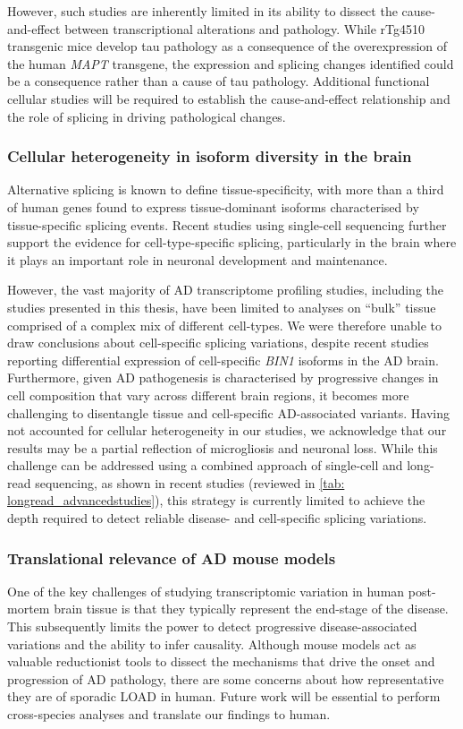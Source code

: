 However, such studies are inherently limited in its ability to dissect the cause-and-effect between transcriptional alterations and pathology. While rTg4510 transgenic mice develop tau pathology as a consequence of the overexpression of the human \textit{MAPT} transgene, the expression and splicing changes identified could be a consequence rather than a cause of tau pathology. Additional functional cellular studies will be required to establish the cause-and-effect relationship and the role of splicing in driving pathological changes. 

\subsubsection{Cellular heterogeneity in isoform diversity in the brain}
Alternative splicing is known to define tissue-specificity, with more than a third of human genes found to express tissue-dominant isoforms characterised by tissue-specific splicing events\cite{Wang2008,Yeo2004}. Recent studies using single-cell sequencing further support the evidence for cell-type-specific splicing, particularly in the brain where it plays an important role in neuronal development and maintenance.

However, the vast majority of AD transcriptome profiling studies, including the studies presented in this thesis, have been limited to analyses on “bulk” tissue comprised of a complex mix of different cell-types. We were therefore unable to draw conclusions about cell-specific splicing variations, despite recent studies reporting differential expression of cell-specific \textit{BIN1} isoforms in the AD brain\cite{Taga2020}. Furthermore, given AD pathogenesis is characterised by progressive changes in cell composition that vary across different brain regions, it becomes more challenging to disentangle tissue and cell-specific AD-associated variants. Having not accounted for cellular heterogeneity in our studies, we acknowledge that our results may be a partial reflection of microgliosis and neuronal loss. While this challenge can be addressed using a combined approach of single-cell and long-read sequencing, as shown in recent studies (reviewed in \cref{tab: longread_advancedstudies}), this strategy is currently limited to achieve the depth required to detect reliable disease- and cell-specific splicing variations. 

\subsubsection{Translational relevance of AD mouse models}
\label{ch7: rTg4510 relevance}
One of the key challenges of studying transcriptomic variation in human post-mortem brain tissue is that they typically represent the end-stage of the disease. This subsequently limits the power to detect progressive disease-associated variations and the ability to infer causality. Although mouse models act as valuable reductionist tools to dissect the mechanisms that drive the onset and progression of AD pathology, there are some concerns about how representative they are of sporadic LOAD in human. Future work will be essential to perform cross-species analyses and translate our findings to human.   

